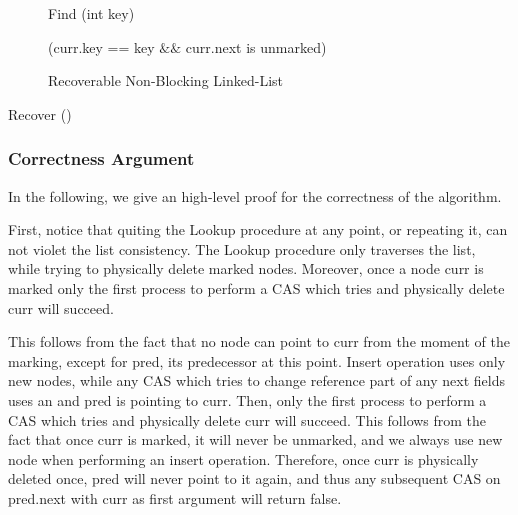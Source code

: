 \begin{figure}[h]
\begin{procedure}[H]
	\end{procedure}

	\begin{procedure}[H]
		\caption{Find (int key)}
		
		
		\KwRet (curr.key == key $\&\&$ curr.next is unmarked)\;
		
	\end{procedure}

	
	\caption{Recoverable Non-Blocking Linked-List}
	\label{linked-list}
\end{figure}



\begin{procedure}[b]
	\caption{Recover ()}
	
	
\end{procedure}


\newpage
\subsubsection*{Correctness Argument}
In the following, we give an high-level proof for the correctness of the algorithm.

First, notice that quiting the Lookup procedure at any point, or repeating it, can not violet the list consistency. The Lookup procedure only traverses the list, while trying to physically delete marked nodes. Moreover, once a node curr is marked only the first process to perform a CAS which tries and physically delete curr will succeed.


This follows from the fact that no node can point to curr from the moment of the marking, except for pred, its predecessor at this point. Insert operation uses only new nodes, while any CAS which tries to change reference part of any next fields uses an 
and pred is pointing to curr. Then, only the first process to perform a CAS which tries and physically delete curr will succeed. This follows from the fact that once curr is marked, it will never be unmarked, and we always use new node when performing an insert operation. Therefore, once curr is physically deleted once, pred will never point to it again, and thus any subsequent CAS on pred.next with curr as first argument will return false.

